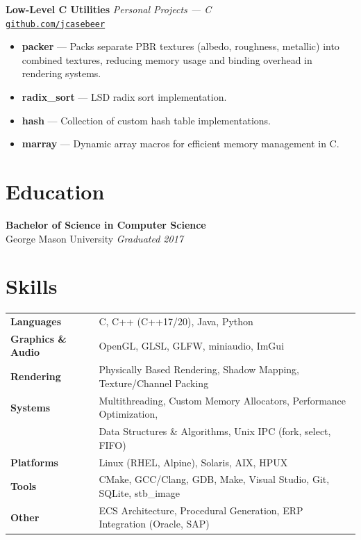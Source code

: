 \documentclass[11pt, letterpaper]{article}
\begin{document}
\noindent\textbf{Low-Level C Utilities} \hfill \textit{Personal Projects --- C}\\
\href{https://github.com/jcasebeer}{\small\texttt{github.com/jcasebeer}}\\[4pt]
\begin{itemize}
  \item \textbf{packer} --- Packs separate PBR textures (albedo, roughness, metallic) into combined textures, reducing memory usage and binding overhead in rendering systems.
  \item \textbf{radix\_sort} --- LSD radix sort implementation.
  \item \textbf{hash} --- Collection of custom hash table implementations.
  \item \textbf{marray} --- Dynamic array macros for efficient memory management in C.
\end{itemize}

\section{Education}

\noindent\textbf{Bachelor of Science in Computer Science}\\
George Mason University \hfill \textit{Graduated 2017}

\section{Skills}

\noindent
\begin{tabular}{@{} l l}
  \textbf{Languages}         & C, C++ (C++17/20), Java, Python \\[3pt]
  \textbf{Graphics \& Audio} & OpenGL, GLSL, GLFW, miniaudio, ImGui \\[3pt]
  \textbf{Rendering}         & Physically Based Rendering, Shadow Mapping, Texture/Channel Packing \\[3pt]
  \textbf{Systems}           & Multithreading, Custom Memory Allocators, Performance Optimization, \\
                             & Data Structures \& Algorithms, Unix IPC (fork, select, FIFO) \\[3pt]
  \textbf{Platforms}         & Linux (RHEL, Alpine), Solaris, AIX, HPUX \\[3pt]
  \textbf{Tools}             & CMake, GCC/Clang, GDB, Make, Visual Studio, Git, SQLite, stb\_image \\[3pt]
  \textbf{Other}             & ECS Architecture, Procedural Generation, ERP Integration (Oracle, SAP) \\
\end{tabular}
\end{document}
